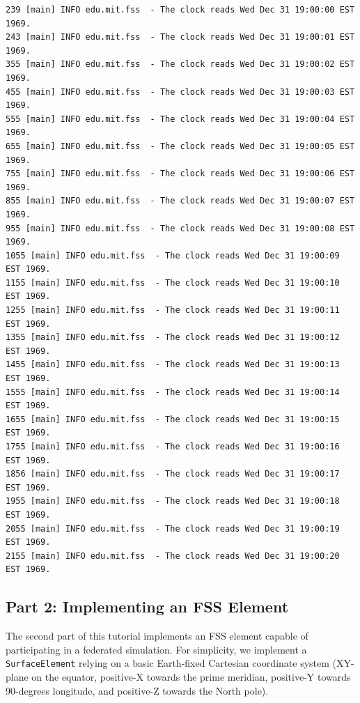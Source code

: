 \documentclass[]{article}
\begin{document}
\begin{Code}
\begin{lstlisting}[caption={ClockFederate main output},label={lst:part1Output},numbers=none]
239 [main] INFO edu.mit.fss  - The clock reads Wed Dec 31 19:00:00 EST 1969.
243 [main] INFO edu.mit.fss  - The clock reads Wed Dec 31 19:00:01 EST 1969.
355 [main] INFO edu.mit.fss  - The clock reads Wed Dec 31 19:00:02 EST 1969.
455 [main] INFO edu.mit.fss  - The clock reads Wed Dec 31 19:00:03 EST 1969.
555 [main] INFO edu.mit.fss  - The clock reads Wed Dec 31 19:00:04 EST 1969.
655 [main] INFO edu.mit.fss  - The clock reads Wed Dec 31 19:00:05 EST 1969.
755 [main] INFO edu.mit.fss  - The clock reads Wed Dec 31 19:00:06 EST 1969.
855 [main] INFO edu.mit.fss  - The clock reads Wed Dec 31 19:00:07 EST 1969.
955 [main] INFO edu.mit.fss  - The clock reads Wed Dec 31 19:00:08 EST 1969.
1055 [main] INFO edu.mit.fss  - The clock reads Wed Dec 31 19:00:09 EST 1969.
1155 [main] INFO edu.mit.fss  - The clock reads Wed Dec 31 19:00:10 EST 1969.
1255 [main] INFO edu.mit.fss  - The clock reads Wed Dec 31 19:00:11 EST 1969.
1355 [main] INFO edu.mit.fss  - The clock reads Wed Dec 31 19:00:12 EST 1969.
1455 [main] INFO edu.mit.fss  - The clock reads Wed Dec 31 19:00:13 EST 1969.
1555 [main] INFO edu.mit.fss  - The clock reads Wed Dec 31 19:00:14 EST 1969.
1655 [main] INFO edu.mit.fss  - The clock reads Wed Dec 31 19:00:15 EST 1969.
1755 [main] INFO edu.mit.fss  - The clock reads Wed Dec 31 19:00:16 EST 1969.
1856 [main] INFO edu.mit.fss  - The clock reads Wed Dec 31 19:00:17 EST 1969.
1955 [main] INFO edu.mit.fss  - The clock reads Wed Dec 31 19:00:18 EST 1969.
2055 [main] INFO edu.mit.fss  - The clock reads Wed Dec 31 19:00:19 EST 1969.
2155 [main] INFO edu.mit.fss  - The clock reads Wed Dec 31 19:00:20 EST 1969.
\end{lstlisting}
\end{Code}

\subsection{Part 2: Implementing an FSS Element}

The second part of this tutorial implements an FSS element capable of participating in a federated simulation. For simplicity, we implement a \texttt{SurfaceElement} relying on a basic Earth-fixed Cartesian coordinate system (XY-plane on the equator, positive-X towards the prime meridian, positive-Y towards 90-degrees longitude, and positive-Z towards the North pole). 
\end{document}
